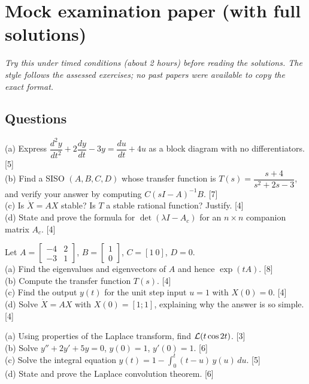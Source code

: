 \section{Mock examination paper (with full solutions)}\label{sec:mock}
\textit{Try this under timed conditions (about 2 hours) before reading the solutions. The style follows the assessed exercises; no past papers were available to copy the exact format.}

\subsection{Questions}
\begin{qbox}[title={M1 (Chapters 1--2) [20 marks]}]
(a) Express $\dfrac{d^2y}{dt^2}+2\dfrac{dy}{dt}-3y=\dfrac{du}{dt}+4u$ as a block diagram with no differentiators. [5]\\
(b) Find a SISO $(A,B,C,D)$ whose transfer function is $T(s)=\dfrac{s+4}{s^2+2s-3}$, and verify your answer by computing $C(sI-A)^{-1}B$. [7]\\
(c) Is $\dot X=AX$ stable? Is $T$ a stable rational function? Justify. [4]\\
(d) State and prove the formula for $\det(\lambda I-A_c)$ for an $n\times n$ companion matrix $A_c$. [4]
\end{qbox}
\begin{qbox}[title={M2 (Chapter 2) [20 marks]}]
Let $A=\begin{bmatrix}-4&2\\-3&1\end{bmatrix}$, $B=\begin{bmatrix}1\\0\end{bmatrix}$, $C=[1\ 0]$, $D=0$.\\
(a) Find the eigenvalues and eigenvectors of $A$ and hence $\exp(tA)$. [8]\\
(b) Compute the transfer function $T(s)$. [4]\\
(c) Find the output $y(t)$ for the unit step input $u=1$ with $X(0)=0$. [4]\\
(d) Solve $\dot X=AX$ with $X(0)=[1;1]$, explaining why the answer is so simple. [4]
\end{qbox}
\begin{qbox}[title={M3 (Chapter 3) [20 marks]}]
(a) Using properties of the Laplace transform, find $\mathcal{L}(t\cos2t)$. [3]\\
(b) Solve $y''+2y'+5y=0$, $y(0)=1$, $y'(0)=1$. [6]\\
(c) Solve the integral equation $y(t)=1-\displaystyle\int_0^t(t-u)\,y(u)\,du$. [5]\\
(d) State and prove the Laplace convolution theorem. [6]
\end{qbox}
